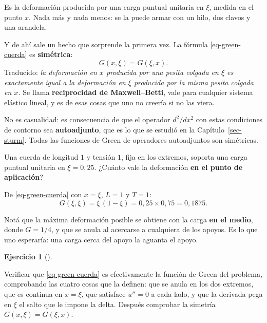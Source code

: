 \documentclass[
  spanish,
  a4paper,
]{scrbook}
\theoremstyle{definition}
\theoremstyle{plain}
\theoremstyle{definition}
\theoremstyle{plain}
\theoremstyle{definition}
\newtheorem{exercise}{Ejercicio}[chapter]
\theoremstyle{remark}
\begin{document}
Es la deformación producida por una carga puntual unitaria en \(\xi\),
medida en el punto \(x\). Nada más y nada menos: se la puede armar con
un hilo, dos clavos y una arandela.

Y de ahí sale un hecho que sorprende la primera vez. La fórmula
\ref{eq-green-cuerda} es \textbf{simétrica}: \[G(x,\xi) = G(\xi,x).\]
Traducido: \emph{la deformación en \(x\) producida por una pesita
colgada en \(\xi\) es exactamente igual a la deformación en \(\xi\)
producida por la misma pesita colgada en \(x\).} Se llama
\textbf{reciprocidad de Maxwell--Betti}, vale para cualquier sistema
elástico lineal, y es de esas cosas que uno no creería si no las viera.

No es casualidad: es consecuencia de que el operador \(d^2/dx^2\) con
estas condiciones de contorno sea \textbf{autoadjunto}, que es lo que se
estudió en la Capítulo~\ref{sec-sturm}. Todas las funciones de Green de
operadores autoadjuntos son simétricas.

Una cuerda de longitud \(1\) y tensión \(1\), fija en los extremos,
soporta una carga puntual unitaria en \(\xi = 0{,}25\). ¿Cuánto vale la
deformación \textbf{en el punto de aplicación}?

De \ref{eq-green-cuerda} con \(x=\xi\), \(L=1\) y \(T=1\):
\[G(\xi,\xi) = \xi\,(1-\xi) = 0{,}25 \times 0{,}75 = 0{,}1875 .\]

Notá que la máxima deformación posible se obtiene con la carga
\textbf{en el medio}, donde \(G = 1/4\), y que se anula al acercarse a
cualquiera de los apoyos. Es lo que uno esperaría: una carga cerca del
apoyo la aguanta el apoyo.

\begin{exercise}[]\protect\hypertarget{exr-green-verificar}{}\label{exr-green-verificar}

Verificar que \ref{eq-green-cuerda} es efectivamente la función de Green
del problema, comprobando las cuatro cosas que la definen: que se anula
en los dos extremos, que es continua en \(x=\xi\), que satisface
\(u''=0\) a cada lado, y que la derivada pega en \(\xi\) el salto que le
impone la delta. Después comprobar la simetría \(G(x,\xi)=G(\xi,x)\).

\end{exercise}
\end{document}
